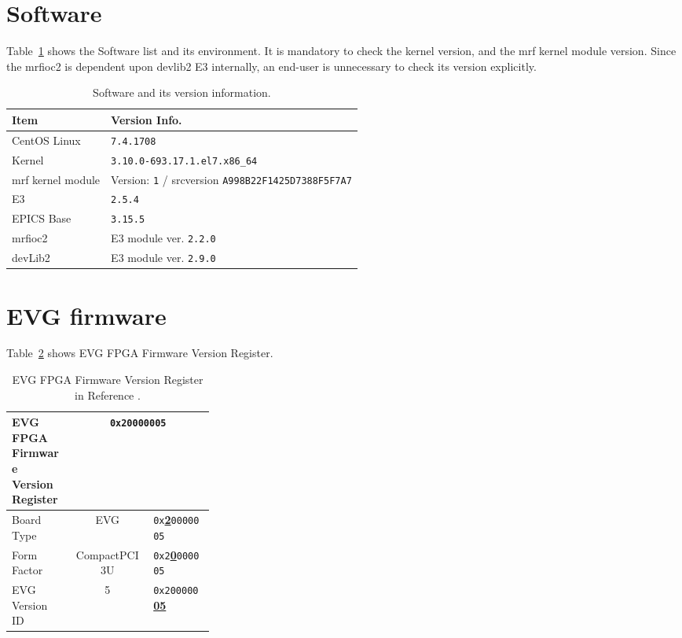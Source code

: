 \documentclass[11pt
  , a4paper
  , article
  , oneside
  , showtrims
]{memoir}
\begin{document}
\clearpage
\section{Software}
Table~\ref{table:swlist} shows the Software list and its environment. It is mandatory to check the kernel version, and the mrf kernel module version. Since the mrfioc2 is dependent upon devlib2 E3 internally, an end-user is unnecessary to check its version explicitly.
\begin{table}[!htb]
  \centering
  \begin{tabular}{l|l}
    \toprule
    Item               & Version Info.                                                      \\\midrule
    CentOS Linux       & \texttt{7.4.1708}                                                  \\\midrule
    Kernel             & \texttt{3.10.0-693.17.1.el7.x86\_64}                               \\\midrule
    mrf kernel module  & Version: \texttt{1} / srcversion \texttt{A998B22F1425D7388F5F7A7}  \\\midrule
    E3                 & \texttt{2.5.4}                                                     \\\midrule
    EPICS Base         & \texttt{3.15.5}                                                    \\\midrule
    mrfioc2            & E3 module ver. \texttt{2.2.0}                                      \\\midrule
    devLib2            & E3 module ver. \texttt{2.9.0}                                      \\\bottomrule
  \end{tabular}
  \caption[]{Software and its version information.}
  \label{table:swlist}
\end{table}

\section{EVG firmware}
Table~\ref{table:fwinfo} shows EVG FPGA Firmware Version Register.

\begin{table}[!htb]
  \centering
  \begin{tabular}{p{0.3\linewidth}|c|l}
    \toprule
    EVG FPGA Firmware Version Register            & \multicolumn{2}{c}{\texttt{0x20000005}}             \\\midrule
    Board Type      & EVG                         &  \texttt{0x}\underline{\textbf{2}}\texttt{0000005}  \\\midrule
    Form Factor     & CompactPCI 3U               &  \texttt{0x2}\underline{\textbf{0}}\texttt{000005}  \\\midrule
    EVG Version ID  & 5                           &  \texttt{0x200000}\underline{\textbf{05}}           \\\bottomrule
  \end{tabular}
  \caption[]{EVG FPGA Firmware Version Register in Reference \citep[see][p32]{MRFEVENTGENERATOR}.}
  \label{table:fwinfo}
\end{table}
\end{document}
